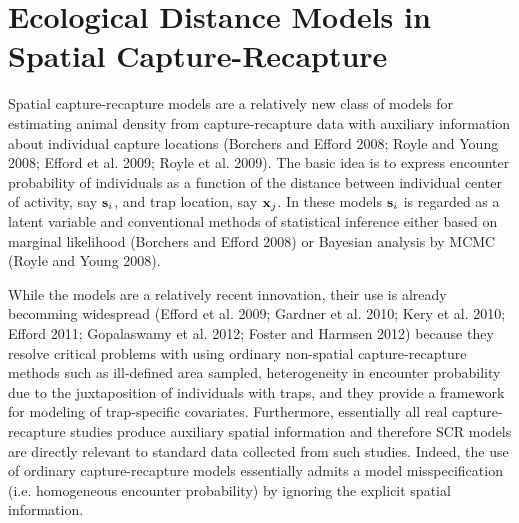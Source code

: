\chapter{
Ecological Distance Models in Spatial Capture-Recapture
}
\label{chapt.implicit}


\vspace{.3in}


Spatial capture-recapture models are a relatively new class of models
for estimating animal density from capture-recapture data with
auxiliary information about individual capture locations (Borchers and
Efford 2008; Royle and Young 2008; Efford et al. 2009; Royle et
al. 2009).  The basic idea
is to express encounter probability of individuals as a function of
the distance between individual center of activity, say ${\bf s}_{i}$,
and trap location, say ${\bf x}_{j}$.  In these models ${\bf s}_{i}$
is regarded as a latent variable and conventional methods of
statistical inference either based on marginal likelihood (Borchers
and Efford 2008) or Bayesian analysis by MCMC (Royle and Young 2008).

While the models are a relatively recent innovation, their use is
already becomming widespread (Efford et al. 2009; Gardner et al. 2010;
Kery et al. 2010;
Efford 2011; Gopalaswamy et al. 2012; Foster and Harmsen 2012) because they resolve critical
problems with using ordinary non-spatial capture-recapture methods
such as ill-defined area sampled,  heterogeneity in encounter
probability due to the juxtaposition of individuals with
traps, and they provide a framework for modeling of trap-specific covariates.
Furthermore, essentially all real capture-recapture studies
produce auxiliary spatial information and therefore SCR models are
directly relevant to standard data collected from such
studies. Indeed, the use of ordinary capture-recapture models
essentially admits a model misspecification (i.e. homogeneous
encounter probability) by ignoring the explicit spatial information.


